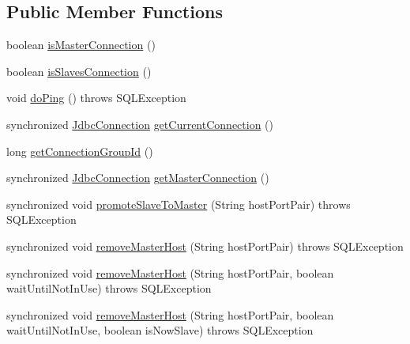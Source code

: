 \subsection*{Public Member Functions}
\begin{DoxyCompactItemize}
\item 
boolean \mbox{\hyperlink{classcom_1_1mysql_1_1cj_1_1jdbc_1_1ha_1_1_replication_connection_proxy_ad8c04913b78285025c503997f66cfd59}{is\+Master\+Connection}} ()
\item 
boolean \mbox{\hyperlink{classcom_1_1mysql_1_1cj_1_1jdbc_1_1ha_1_1_replication_connection_proxy_a60e188119cdd841f01e6d39f72f777e9}{is\+Slaves\+Connection}} ()
\item 
void \mbox{\hyperlink{classcom_1_1mysql_1_1cj_1_1jdbc_1_1ha_1_1_replication_connection_proxy_ae2c2446c646d5bc28578f3f35695ef45}{do\+Ping}} ()  throws S\+Q\+L\+Exception 
\item 
synchronized \mbox{\hyperlink{interfacecom_1_1mysql_1_1cj_1_1jdbc_1_1_jdbc_connection}{Jdbc\+Connection}} \mbox{\hyperlink{classcom_1_1mysql_1_1cj_1_1jdbc_1_1ha_1_1_replication_connection_proxy_a1641eba211bf1931920c610bf4a8fa36}{get\+Current\+Connection}} ()
\item 
long \mbox{\hyperlink{classcom_1_1mysql_1_1cj_1_1jdbc_1_1ha_1_1_replication_connection_proxy_a3d870ba961bc6b4220e2dcbedc648d77}{get\+Connection\+Group\+Id}} ()
\item 
synchronized \mbox{\hyperlink{interfacecom_1_1mysql_1_1cj_1_1jdbc_1_1_jdbc_connection}{Jdbc\+Connection}} \mbox{\hyperlink{classcom_1_1mysql_1_1cj_1_1jdbc_1_1ha_1_1_replication_connection_proxy_aa31c17012e953481a21cc12b203b34b1}{get\+Master\+Connection}} ()
\item 
synchronized void \mbox{\hyperlink{classcom_1_1mysql_1_1cj_1_1jdbc_1_1ha_1_1_replication_connection_proxy_ac3d82982ac768a09bfc1072ef054cf20}{promote\+Slave\+To\+Master}} (String host\+Port\+Pair)  throws S\+Q\+L\+Exception 
\item 
synchronized void \mbox{\hyperlink{classcom_1_1mysql_1_1cj_1_1jdbc_1_1ha_1_1_replication_connection_proxy_a6e52fc103ed552935766ffeee2d0ec36}{remove\+Master\+Host}} (String host\+Port\+Pair)  throws S\+Q\+L\+Exception 
\item 
synchronized void \mbox{\hyperlink{classcom_1_1mysql_1_1cj_1_1jdbc_1_1ha_1_1_replication_connection_proxy_ad056ad35a7e862d6369517f937f995f9}{remove\+Master\+Host}} (String host\+Port\+Pair, boolean wait\+Until\+Not\+In\+Use)  throws S\+Q\+L\+Exception 
\item 
synchronized void \mbox{\hyperlink{classcom_1_1mysql_1_1cj_1_1jdbc_1_1ha_1_1_replication_connection_proxy_ab37b33ee093138864fab30e6b778011d}{remove\+Master\+Host}} (String host\+Port\+Pair, boolean wait\+Until\+Not\+In\+Use, boolean is\+Now\+Slave)  throws S\+Q\+L\+Exception 

\end{DoxyCompactItemize}
